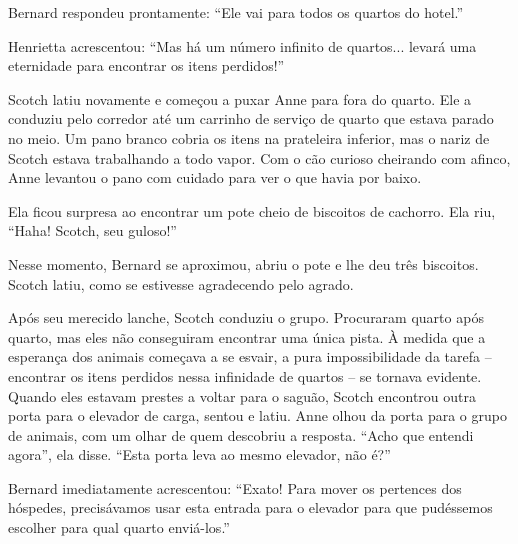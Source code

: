 Bernard respondeu prontamente: ``Ele vai para todos os quartos do hotel.''

Henrietta acrescentou: ``Mas há um número infinito de quartos... levará uma eternidade para encontrar os itens perdidos!''

Scotch latiu novamente e começou a puxar Anne para fora do quarto. Ele a conduziu pelo corredor até um carrinho de serviço de quarto que estava parado no meio. Um pano branco cobria os itens na prateleira inferior, mas o nariz de Scotch estava trabalhando a todo vapor. Com o cão curioso cheirando com afinco, Anne levantou o pano com cuidado para ver o que havia por baixo.

Ela ficou surpresa ao encontrar um pote cheio de biscoitos de cachorro. Ela riu, ``Haha! Scotch, seu guloso!''

Nesse momento, Bernard se aproximou, abriu o pote e lhe deu três biscoitos. Scotch latiu, como se estivesse agradecendo pelo agrado.


Após seu merecido lanche, Scotch conduziu o grupo. Procuraram quarto após quarto, mas eles não conseguiram encontrar uma única pista. À medida que a esperança dos animais começava a se esvair, a pura impossibilidade da tarefa -- encontrar os itens perdidos nessa infinidade de quartos -- se tornava evidente. Quando eles estavam prestes a voltar para o saguão, Scotch encontrou outra porta para o elevador de carga, sentou e latiu.
Anne olhou da porta para o grupo de animais, com um olhar de quem descobriu a resposta. ``Acho que entendi agora'', ela disse. ``Esta porta leva ao mesmo elevador, não é?''

Bernard imediatamente acrescentou: ``Exato! Para mover os pertences dos hóspedes, precisávamos usar esta entrada para o elevador para que pudéssemos escolher para qual quarto enviá-los.''

\clearpage


\clearpage


